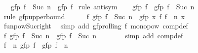 \begin{isabellebody}
\ \ \ {\isachardoublequoteopen}gfp\ {\isacharparenleft}{\kern0pt}f\ {\isacharcircum}{\kern0pt}{\isacharcircum}{\kern0pt}\ Suc\ n{\isacharparenright}{\kern0pt}\ {\isacharequal}{\kern0pt}\ gfp\ f{\isachardoublequoteclose}\isanewline
%
\isadelimproof
%
\endisadelimproof
%
\isatagproof
{}\isamarkupfalse%
\ {\isacharparenleft}{\kern0pt}rule\ antisym{\isacharparenright}{\kern0pt}\isanewline
\ \ \isamarkupfalse%
\ {\isachardoublequoteopen}gfp\ f\ {\isasymge}\ gfp\ {\isacharparenleft}{\kern0pt}f\ {\isacharcircum}{\kern0pt}{\isacharcircum}{\kern0pt}\ Suc\ n{\isacharparenright}{\kern0pt}{\isachardoublequoteclose}\isanewline
\ \ \isamarkupfalse%
\ {\isacharparenleft}{\kern0pt}rule\ gfp{\isacharunderscore}{\kern0pt}upperbound{\isacharparenright}{\kern0pt}\isanewline
\ \ \ \ \isamarkupfalse%
\ {\isachardoublequoteopen}f\ {\isacharparenleft}{\kern0pt}gfp\ {\isacharparenleft}{\kern0pt}f\ {\isacharcircum}{\kern0pt}{\isacharcircum}{\kern0pt}\ Suc\ n{\isacharparenright}{\kern0pt}{\isacharparenright}{\kern0pt}\ {\isacharequal}{\kern0pt}\ gfp\ {\isacharparenleft}{\kern0pt}{\isasymlambda}x{\isachardot}{\kern0pt}\ f\ {\isacharparenleft}{\kern0pt}{\isacharparenleft}{\kern0pt}f\ {\isacharcircum}{\kern0pt}{\isacharcircum}{\kern0pt}\ n{\isacharparenright}{\kern0pt}\ x{\isacharparenright}{\kern0pt}{\isacharparenright}{\kern0pt}{\isachardoublequoteclose}\isanewline
\ \ \ \ \ \ \isamarkupfalse%
\ funpow{\isacharunderscore}{\kern0pt}Suc{\isacharunderscore}{\kern0pt}right\ \isamarkupfalse%
\ {\isacharparenleft}{\kern0pt}simp\ add{\isacharcolon}{\kern0pt}\ gfp{\isacharunderscore}{\kern0pt}rolling\ f\ mono{\isacharunderscore}{\kern0pt}pow\ comp{\isacharunderscore}{\kern0pt}def{\isacharparenright}{\kern0pt}\isanewline
\ \ \ \ \isamarkupfalse%
\ \isamarkupfalse%
\ {\isachardoublequoteopen}f\ {\isacharparenleft}{\kern0pt}gfp\ {\isacharparenleft}{\kern0pt}f\ {\isacharcircum}{\kern0pt}{\isacharcircum}{\kern0pt}\ Suc\ n{\isacharparenright}{\kern0pt}{\isacharparenright}{\kern0pt}\ {\isasymge}\ gfp\ {\isacharparenleft}{\kern0pt}f\ {\isacharcircum}{\kern0pt}{\isacharcircum}{\kern0pt}\ Suc\ n{\isacharparenright}{\kern0pt}{\isachardoublequoteclose}\isanewline
\ \ \ \ \ \ \isamarkupfalse%
\ {\isacharparenleft}{\kern0pt}simp\ add{\isacharcolon}{\kern0pt}\ comp{\isacharunderscore}{\kern0pt}def{\isacharparenright}{\kern0pt}\isanewline
\ \ \isamarkupfalse%
\isanewline
\ \ \isamarkupfalse%
\ {\isachardoublequoteopen}{\isacharparenleft}{\kern0pt}f\ {\isacharcircum}{\kern0pt}{\isacharcircum}{\kern0pt}\ n{\isacharparenright}{\kern0pt}\ {\isacharparenleft}{\kern0pt}gfp\ f{\isacharparenright}{\kern0pt}\ {\isacharequal}{\kern0pt}\ gfp\ f{\isachardoublequoteclose}\ \ n\isanewline

\end{isabellebody}
